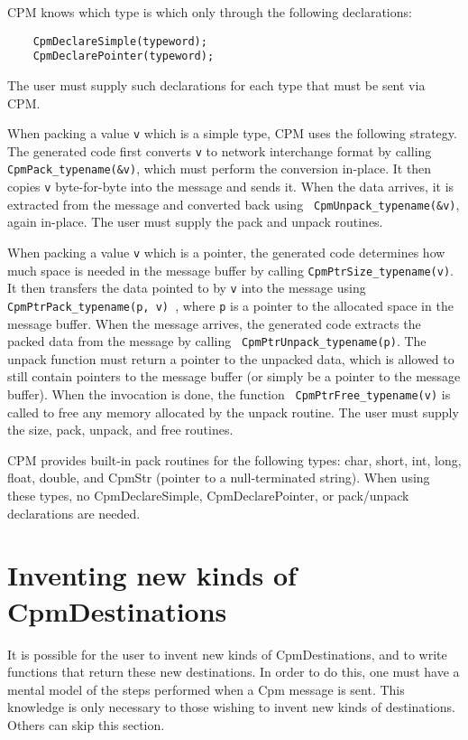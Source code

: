 CPM knows which type is which only through the following declarations:

\begin{verbatim}
    CpmDeclareSimple(typeword);
    CpmDeclarePointer(typeword);
\end{verbatim}

The user must supply such declarations for each type that must be sent
via CPM.

When packing a value {\tt v} which is a simple type, CPM uses the
following strategy.  The generated code first converts {\tt v} to
network interchange format by calling {\tt CpmPack\_typename(\&v)},
which must perform the conversion in-place.  It then copies {\tt v}
byte-for-byte into the message and sends it.  When the data arrives,
it is extracted from the message and converted back using {\tt
CpmUnpack\_typename(\&v)}, again in-place.  The user must supply the
pack and unpack routines.

When packing a value {\tt v} which is a pointer, the generated code
determines how much space is needed in the message buffer by calling
{\tt CpmPtrSize\_typename(v)}.  It then transfers the data pointed to
by {\tt v} into the message using {\tt CpmPtrPack\_typename(p, v) },
where {\tt p} is a pointer to the allocated space in the message
buffer.  When the message arrives, the generated code extracts the
packed data from the message by calling {\tt
CpmPtrUnpack\_typename(p)}.  The unpack function must return a pointer
to the unpacked data, which is allowed to still contain pointers to
the message buffer (or simply be a pointer to the message buffer).
When the invocation is done, the function {\tt
CpmPtrFree\_typename(v)} is called to free any memory allocated by the
unpack routine. The user must supply the size, pack, unpack, and free
routines.

CPM provides built-in pack routines for the following types: char,
short, int, long, float, double, and CpmStr (pointer to a
null-terminated string).  When using these types, no CpmDeclareSimple,
CpmDeclarePointer, or pack/unpack declarations are needed.

\section{Inventing new kinds of CpmDestinations}

It is possible for the user to invent new kinds of CpmDestinations,
and to write functions that return these new destinations.  In order
to do this, one must have a mental model of the steps performed when a
Cpm message is sent.  This knowledge is only necessary to those
wishing to invent new kinds of destinations.  Others can skip this
section.

